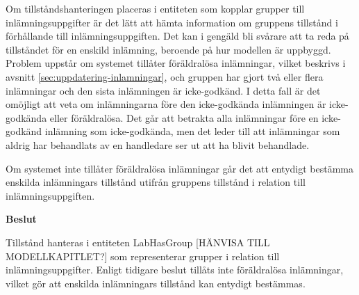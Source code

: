 Om tillståndshanteringen placeras i entiteten som kopplar grupper till inlämningsuppgifter är det lätt att hämta information om gruppens tillstånd i förhållande till inlämningsuppgiften. Det kan i gengäld bli svårare att ta reda på tillståndet för en enskild inlämning, beroende på hur modellen är uppbyggd. Problem uppstår om systemet tillåter föräldralösa inlämningar, vilket beskrivs i avsnitt \ref{sec:uppdatering-inlamningar}, och gruppen har gjort två eller flera inlämningar och den sista inlämningen är icke-godkänd. I detta fall är det omöjligt att veta om inlämningarna före den icke-godkända inlämningen är icke-godkända eller föräldralösa. Det går att betrakta alla inlämningar före en icke-godkänd inlämning som icke-godkända, men det leder till att inlämningar som aldrig har behandlats av en handledare ser ut att ha blivit behandlade.

Om systemet inte tillåter föräldralösa inlämningar går det att entydigt bestämma enskilda inlämningars tillstånd utifrån gruppens tillstånd i relation till inlämningsuppgiften.

\begin{flushright}

  \textbf{Beslut}

  Tillstånd hanteras i entiteten LabHasGroup [HÄNVISA TILL MODELLKAPITLET?] som representerar grupper i relation till inlämningsuppgifter. Enligt tidigare beslut tillåts inte föräldralösa inlämningar, vilket gör att enskilda inlämningars tillstånd kan entydigt bestämmas.
\end{flushright}
